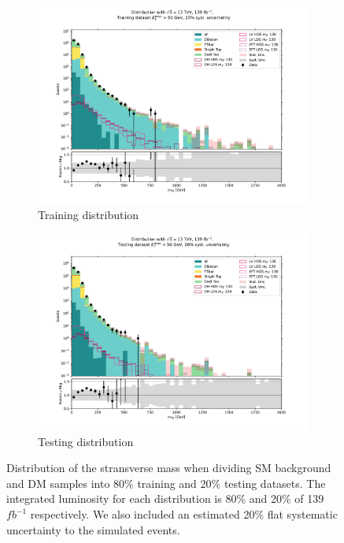 \documentclass[12pt, a4paper]{book}
\begin{document}
\begin{figure}[!ht]
	\centering
	\begin{subfigure}[b]{0.49\textwidth}
        \centering
        \includegraphics[width=1\textwidth]{mt2_train.pdf}
        \caption{Training distribution}
     \end{subfigure}
     \hfill
     \begin{subfigure}[b]{0.49\textwidth}
        \centering
        \includegraphics[width=1\textwidth]{mt2_test.pdf}
        \caption{Testing distribution}
     \end{subfigure}
	\caption[Train-test split distribution]{Distribution of the stransverse mass when dividing SM background and DM samples into 80\% training and 20\% testing datasets. The integrated luminosity for each distribution is 80\% and 20\% of 139 $fb^{-1}$ respectively. We also included an estimated 20\% flat systematic uncertainty to the simulated events.}\label{fig:train-test}
\end{figure}
\end{document}
